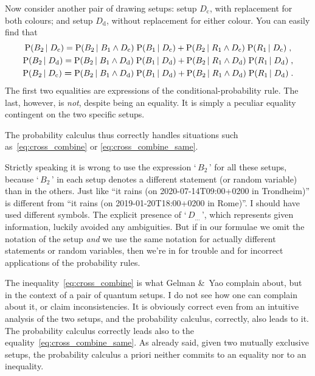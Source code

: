 \documentclass[\ifafour a4paper,12pt,\else a5paper,10pt,\fi%
onecolumn,oneside,article,%
british%
]{memoir}
\newcommand*{\defquote}[1]{`\,#1\,'}
\theoremstyle{remark}
\theoremstyle{innote}
\newcommand*{\amp}{\&}
\newcommand*{\p}{\mathrm{P}}%
\renewcommand*{\|}[1][]{\nonscript\,#1\vert\nonscript\;\mathopen{}}
\newcommand*{\yDc}{D_{\textrm{c}}}
\newcommand*{\yDd}{D_{\textrm{d}}}
\begin{document}
\medskip

Now consider another pair of drawing setups: setup $\yDc$, with replacement
for both colours; and setup $\yDd$, without replacement for either colour.
You can easily find that
\begin{gather}
  \p(B_{2} \| \yDc) =%
  \p(B_{2} \| B_{1} \land \yDc) \; \p( B_{1} \| \yDc) +
  \p(B_{2} \| R_{1} \land \yDc)  \; \p( R_{1} \| \yDc) \;,
  \\
  \p(B_{2} \| \yDd) =%
  \p(B_{2} \| B_{1} \land \yDd) \; \p( B_{1} \| \yDd) +
  \p(B_{2} \| R_{1} \land \yDd)  \; \p( R_{1} \| \yDd) \;,
  \\
  \label{eq:cross_combine_same}
  \p(B_{2} \| \yDc) \mathrel{\bm{=}}
  \p(B_{2} \| B_{1} \land \yDd) \; \p( B_{1} \| \yDd) +
  \p(B_{2} \| R_{1} \land \yDd)  \; \p( R_{1} \| \yDd) \;.
\end{gather}
The first two equalities are expressions of the conditional-probability
rule. The last, however, is \emph{not}, despite being an equality. It is
simply a peculiar equality contingent on the two specific setups.

The probability calculus thus correctly handles situations such
as~\eqref{eq:cross_combine} or \eqref{eq:cross_combine_same}.

\medskip

Strictly speaking it is wrong to use the expression \defquote{$B_{2}$} for
all these setups, because \defquote{$B_{2}$} in each setup denotes a
different statement (or random variable) than in the others. Just like
\enquote{it rains (on 2020-07-14T09:00+0200 in Trondheim)} is different
from \enquote{it rains (on 2019-01-20T18:00+0200 in Rome)}. I should have
used different symbols. The explicit presence of \defquote{$D_{\dotso}$},
which represents given information, luckily avoided any ambiguities. But if
in our formulae we omit the notation of the setup \emph{and} we use the
same notation for actually different statements or random variables, then
we're in for trouble and for incorrect applications of the probability
rules.

\medskip

The inequality~\eqref{eq:cross_combine} is what Gelman \amp\ Yao complain
about, but in the context of a pair of quantum setups. I do not see how one
can complain about it, or claim inconsistencies. It is obviously correct
even from an intuitive analysis of the two setups, and the probability
calculus, correctly, also leads to it. The probability calculus correctly
leads also to the equality~\eqref{eq:cross_combine_same}. As already said,
given two mutually exclusive setups, the probability calculus a priori
neither commits to an equality nor to an inequality.
\end{document}
